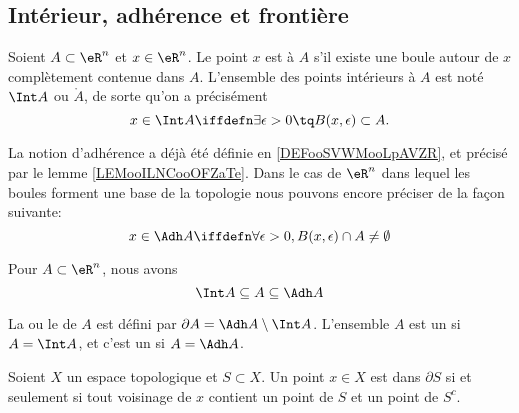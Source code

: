 					\subsection{Intérieur, adhérence et frontière}

\begin{definition}
  Soient $A \subset \eR^n$ et $x \in \eR^n$. Le point $x$ est  à $A$ s'il existe une boule autour de $x$ complètement contenue dans $A$. L'ensemble des points intérieurs à $A$ est noté $\Int A$ ou $\mathring A$, de sorte qu'on a précisément
  \begin{equation*}
    x \in \Int A \iffdefn  \exists \epsilon > 0 \tq
    B(x,\epsilon) \subset A.
  \end{equation*}
\end{definition}

\begin{normaltext}  
    
La notion d'adhérence a déjà été définie en \ref{DEFooSVWMooLpAVZR}, et précisé par le lemme \ref{LEMooILNCooOFZaTe}. Dans le cas de \( \eR^n\) dans lequel les boules forment une base de la topologie nous pouvons encore préciser de la façon suivante: 
\begin{equation}
	x \in \Adh A \iffdefn \forall \epsilon > 0, B(x,\epsilon) \cap A \neq \emptyset
\end{equation}
\end{normaltext}

\begin{proposition}
Pour $A \subset \eR^n$, nous avons
\begin{equation*}
	\Int A \subseteq A  \subseteq \Adh A
\end{equation*}
\end{proposition}

\begin{definition}      \label{DEFooACVLooRwehTl}
  La  ou le  de $A$ est défini par $\partial A = \Adh A \setminus \Int A$. L'ensemble $A$ est un  si $A = \Int A$, et c'est un  si $A = \Adh A$.
\end{definition}

\begin{lemma}      \label{LEMooEUYEooYcUfKr}
    Soient \( X\) un espace topologique et \( S\subset X\). Un point \( x\in X\) est dans \( \partial S\) si et seulement si tout voisinage de \( x\) contient un point de \( S\) et un point de \( S^c\).
\end{lemma}

